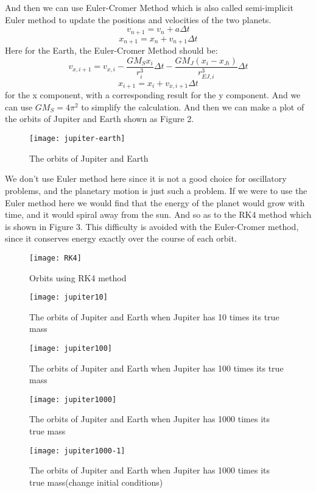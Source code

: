 \documentclass{article}
\begin{document}
And then we can use Euler-Cromer Method which is also called semi-implicit Euler method to update the positions and velocities of the two planets. 
\[
v_{n+1}=v_n+a\Delta t
\]
\[
x_{n+1}=x_n+v_{n+1}\Delta t
\]
Here for the Earth, the Euler-Cromer Method should be:
\[
v_{x,i+1}=v_{x,i}-\frac{GM_Sx_i}{r_i^3}\Delta t-\frac{GM_J(x_i-x_{Ji})}{r_{EJ,i}^3}\Delta t
\]
\[
x_{i+1}=x_i+v_{x,i+1}\Delta t
\]
for the x component, with a corresponding result for the y component. And we can use $GM_S=4\pi^2$ to simplify the calculation. And then we can make a plot of the orbits of Jupiter and Earth shown as Figure 2.
\begin{figure}
\centering
\texttt{[image: jupiter-earth]} 
\caption{The orbits of Jupiter and Earth}
\label{Fig:2} 
\end{figure}

We don't use Euler method here since it is not a good choice for oscillatory problems, and the planetary motion is just such a problem. If we were to use the Euler method here we would find that the energy of the planet would grow with time, and it would spiral away from the sun. And so as to the RK4 method which is shown in Figure 3. This difficulty is avoided with the Euler-Cromer method, since it conserves energy exactly over the course of each orbit.

\begin{figure}
\centering
\texttt{[image: RK4]} 
\caption{Orbits using RK4 method}
\label{Fig:3} 
\end{figure}
\begin{figure}
\centering
\texttt{[image: jupiter10]} 
\caption{The orbits of Jupiter and Earth when Jupiter has 10 times its true mass}
\label{Fig:4} 
\end{figure}
\begin{figure}
\centering
\texttt{[image: jupiter100]} 
\caption{The orbits of Jupiter and Earth when Jupiter has 100 times its true mass}
\label{Fig:5} 
\end{figure}
\begin{figure}
\centering
\texttt{[image: jupiter1000]} 
\caption{The orbits of Jupiter and Earth when Jupiter has 1000 times its true mass}
\label{Fig:6} 
\end{figure}
\begin{figure}
\centering
\texttt{[image: jupiter1000-1]} 
\caption{The orbits of Jupiter and Earth when Jupiter has 1000 times its true mass(change initial conditions)}
\label{Fig:7} 
\end{figure}
\end{document}
